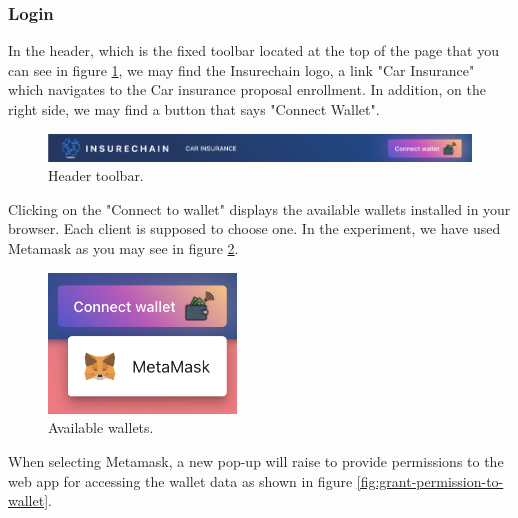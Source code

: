 \subsubsection{Login}
{
In the header, which is the fixed toolbar located at the top of the page that you can see in figure \ref{fig:header-toolbar}, we may find the Insurechain logo, a link "Car Insurance" which navigates to the Car insurance proposal enrollment. In addition, on the right side, we may find a button that says "Connect Wallet".
\begin{figure}[H]
\centering
\includegraphics[width=14cm]{img/results/header.png}
\caption[Insurechain: Header toolbar]{\footnotesize{Header toolbar.}}

\label{fig:header-toolbar}
\end{figure}

Clicking on the "Connect to wallet" displays the available wallets installed in your browser. Each client is supposed to choose one. In the experiment, we have used Metamask as you may see in figure \ref{fig:wallet-list}. 

\begin{figure}[H]
\centering
\includegraphics[width=5cm]{img/results/auth-wallet-list.png}
\caption[Insurechain: Available wallets]{\footnotesize{Available wallets.}}
\label{fig:wallet-list}
\end{figure}

When selecting Metamask, a new pop-up will raise to provide permissions to the web app for accessing the wallet data as shown in figure \ref{fig:grant-permission-to-wallet}.

}
